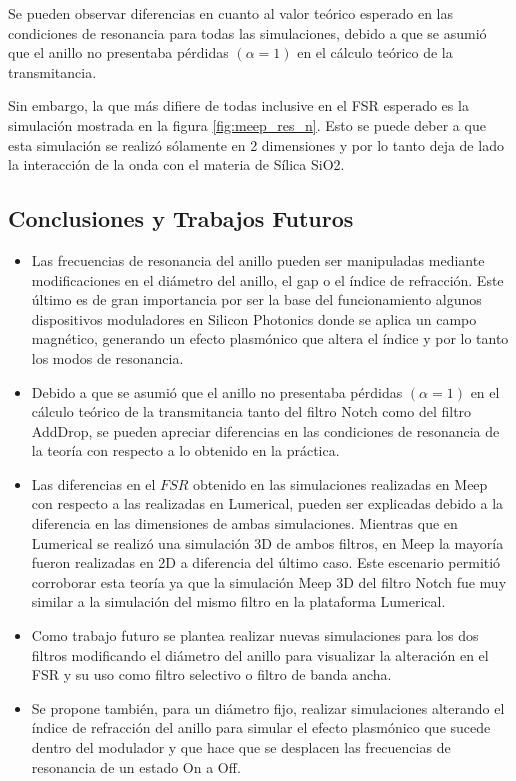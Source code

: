 Se pueden observar diferencias en cuanto al valor teórico esperado en las
condiciones de resonancia para todas las simulaciones,
debido a que se asumió que el anillo no presentaba pérdidas $(\alpha = 1)$ en
el cálculo teórico de la transmitancia.

Sin embargo, la que más difiere de todas inclusive en el FSR esperado 
es la simulación mostrada en la figura \ref{fig:meep_res_n}. Esto se puede deber a
que esta simulación se realizó sólamente en 2 dimensiones y por lo tanto
deja de lado la interacción de la onda con el materia de Sílica SiO2.


\subsection{Conclusiones y Trabajos Futuros}
\begin{itemize}
\item Las frecuencias de resonancia del anillo pueden ser manipuladas mediante
modificaciones en el diámetro del anillo, el gap o el índice de refracción. Este
último es de gran importancia por ser la base del funcionamiento algunos dispositivos
moduladores en Silicon Photonics donde se aplica un campo
magnético, generando un efecto plasmónico que altera el índice y por lo tanto
los modos de resonancia.
\item Debido a que se asumió que el anillo no presentaba pérdidas $(\alpha = 1)$ en
el cálculo teórico de la transmitancia tanto del filtro Notch como del filtro
AddDrop, se pueden apreciar diferencias en las condiciones de resonancia
de la teoría con respecto a lo obtenido en la práctica.
\item Las diferencias en el $FSR$ obtenido en las simulaciones realizadas en Meep
con respecto a las realizadas en Lumerical, pueden ser explicadas debido a la 
diferencia en las dimensiones de ambas simulaciones. Mientras que en Lumerical 
se realizó una simulación 3D de ambos filtros, en Meep la mayoría fueron realizadas
en 2D a diferencia del último caso. Este escenario permitió corroborar esta teoría
ya que la simulación Meep 3D del filtro Notch fue muy similar a la simulación del mismo
filtro en la plataforma Lumerical.
\item Como trabajo futuro se plantea realizar nuevas simulaciones para los dos
filtros modificando el diámetro del anillo para visualizar 
la alteración en el FSR y su uso como filtro selectivo o filtro de banda ancha.
\item Se propone también, para un diámetro fijo, realizar simulaciones alterando 
el índice de refracción del anillo para simular el efecto plasmónico que 
sucede dentro del modulador y que hace que se desplacen las frecuencias de resonancia
de un estado On a Off.
\end{itemize} 
